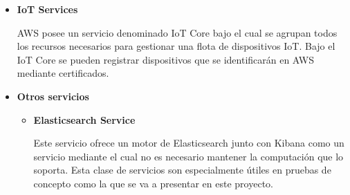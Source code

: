 \documentclass[../../memoria.tex]{subfiles}
\begin{document}
\begin{itemize}
      \item \textbf{IoT Services}
            \par
            AWS posee un servicio denominado IoT Core bajo el cual se agrupan todos los recursos necesarios para gestionar una flota de dispositivos IoT. Bajo el IoT Core se pueden registrar dispositivos que se identificarán en AWS mediante certificados.

      \item \textbf{Otros servicios}
            \begin{itemize}
                  \item \textbf{Elasticsearch Service}
                        \par
                        Este servicio ofrece un motor de Elasticsearch junto con Kibana como un servicio mediante el cual no es necesario mantener la computación que lo soporta. Esta clase de servicios son especialmente útiles en pruebas de concepto como la que se va a presentar en este proyecto.
            \end{itemize}
\end{itemize}
\end{document}
